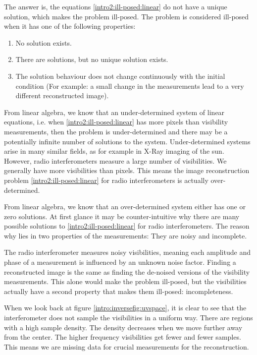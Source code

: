The answer is, the equations \eqref{intro2:ill-posed:linear} do not have a unique solution, which makes the problem ill-posed. The problem is considered ill-posed when it has one of the following properties:
\begin{enumerate}
	\item No solution exists.
	\item There are solutions, but no unique solution exists.
	\item The solution behaviour does not change continuously with the initial condition (For example: a small change in the measurements lead to a very different reconstructed image).
\end{enumerate}
From linear algebra, we know that an under-determined system of linear equations, i.e. when \eqref{intro2:ill-posed:linear} has more pixels than visibility measurements, then the problem is under-determined and there may be a potentially infinite number of solutions to the system. Under-determined systems arise in many similar fields, as for example in X-Ray imaging of the sun\cite{felix2017compressed}. However, radio interferometers measure a large number of visibilities. We generally have more visibilities than pixels. This means the image reconstruction problem \eqref{intro2:ill-posed:linear} for radio interferometers is actually over-determined.

From linear algebra, we know that an over-determined system either has one or zero solutions. At first glance it may be counter-intuitive why there are many possible solutions to \eqref{intro2:ill-posed:linear} for radio interferometers. The reason why lies in two properties of the measurements: They are noisy and incomplete.

The radio interferometer measures noisy visibilities, meaning each amplitude and phase of a measurement is influenced by an unknown noise factor. Finding a reconstructed image is the same as finding the de-noised versions of the visibility measurements. This alone would make the problem ill-posed, but the visibilities actually have a second property that makes them ill-posed: incompleteness.

When we look back at figure \ref{intro:inversefig:uvspace}, it is clear to see that the interferometer does not sample the visibilities in a uniform way. There are regions with a high sample density. The density decreases when we move further away from the center. The higher frequency visibilities get fewer and fewer samples. This means we are missing data for crucial measurements for the reconstruction.

